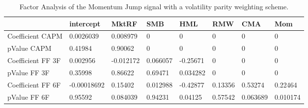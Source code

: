 \begin{table}[H]
\centering
\begin{tabular}{llllllll}
& intercept & MktRF & SMB & HML & RMW & CMA & Mom \\ 
\hline 
Coefficient CAPM & 0.0026039 & 0.008979 & 0 & 0 & 0 & 0 & 0 \\ 
pValue CAPM & 0.41984 & 0.90062 & 0 & 0 & 0 & 0 & 0 \\ 
Coefficient FF 3F & 0.002956 & -0.012172 & 0.066057 & -0.25671 & 0 & 0 & 0 \\ 
pValue FF 3F & 0.35998 & 0.86622 & 0.69471 & 0.034282 & 0 & 0 & 0 \\ 
Coefficient FF 6F & -0.00018692 & 0.15402 & 0.012988 & -0.42877 & 0.13356 & 0.53274 & 0.22464 \\ 
pValue FF 6F & 0.95592 & 0.084039 & 0.94231 & 0.04125 & 0.57542 & 0.063689 & 0.010174 \\ 
\hline
\end{tabular}
\caption{Factor Analysis of the Momentum Jump signal with a volatility parity weighting scheme.}
\label{MOMJUMPVP_FACTOR}
\end{table}